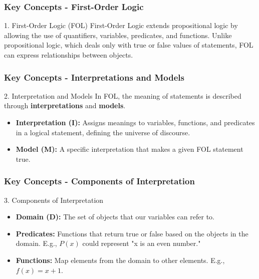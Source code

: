 \documentclass[aspectratio=169]{beamer}
\begin{document}
\begin{frame}[fragile]
    \frametitle{Key Concepts - First-Order Logic}
    \begin{block}{1. First-Order Logic (FOL)}
        First-Order Logic extends propositional logic by allowing the use of quantifiers, variables, predicates, and functions. 
        Unlike propositional logic, which deals only with true or false values of statements, FOL can express relationships between objects.
    \end{block}
\end{frame}

\begin{frame}[fragile]
    \frametitle{Key Concepts - Interpretations and Models}
    \begin{block}{2. Interpretation and Models}
        In FOL, the meaning of statements is described through \textbf{interpretations} and \textbf{models}.
        \begin{itemize}
            \item \textbf{Interpretation (I):} Assigns meanings to variables, functions, and predicates in a logical statement, defining the universe of discourse.
            \item \textbf{Model (M):} A specific interpretation that makes a given FOL statement true.
        \end{itemize}
    \end{block}
\end{frame}

\begin{frame}[fragile]
    \frametitle{Key Concepts - Components of Interpretation}
    \begin{block}{3. Components of Interpretation}
        \begin{itemize}
            \item \textbf{Domain (D):} The set of objects that our variables can refer to.
            \item \textbf{Predicates:} Functions that return true or false based on the objects in the domain. E.g., $P(x)$ could represent "x is an even number."
            \item \textbf{Functions:} Map elements from the domain to other elements. E.g., $f(x) = x + 1$.
        \end{itemize}
    \end{block}
\end{frame}
\end{document}
